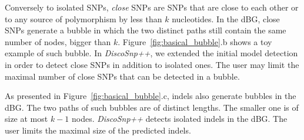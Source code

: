 \documentclass{bmcart}
\newcommand{\discopp}{{\it DiscoSnp++}\xspace}
\begin{document}
Conversely to isolated SNPs, \emph{close} SNPs are SNPs that are close to each other or to any source of polymorphism by less than $k$ nucleotides.
In the dBG, close SNPs generate a bubble in which the two distinct paths still contain the same number of nodes, bigger than $k$.
Figure~\ref{fig:basical_bubble}.b shows a toy example of such bubble.  
In \discopp, we extended the initial model detection in order to detect close SNPs in addition to isolated ones. The user may limit the maximal number of close SNPs that can be detected in a bubble. %



As presented in Figure~\ref{fig:basical_bubble}.c, indels also generate bubbles in the dBG. The two paths of such bubbles are of distinct lengths. The smaller one is of size at most $k-1$ nodes. \discopp detects isolated indels in the dBG. The user limits the maximal size of the predicted indels. 
\end{document}
